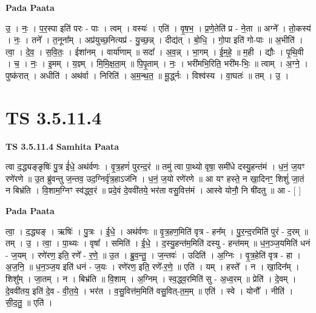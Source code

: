 \documentclass[17pt]{extarticle}
\begin{document}
\textbf{Pada Paata} \newline

उ॒ । नः॒ । प॒र॒स्पा इति॑ परः - पाः । त्वम् । वस्यः॑ । एति॑ । वृ॒ष॒भ॒ । प्र॒णे॒तेति॑ प्र - ने॒ता ॥ अग्ने᳚ । तो॒कस्य॑ । नः॒ । तने᳚ । त॒नूना᳚म् । अप्र॑युच्छ॒नित्यप्र॑ - यु॒च्छ॒न्न् । दीद्य॑त् । बो॒धि॒ । गो॒पा इति॑ गो-पाः ॥ अ॒भीति॑ । त्वा॒ । दे॒व॒ । स॒वि॒तः॒ । ईशा॑नम् । वार्या॑णाम् ॥ सदा᳚ । अ॒व॒न्न् । भा॒गम् । ई॒म॒हे॒ ॥ म॒ही । द्यौः । पृ॒थि॒वी । च॒ । नः॒ । इ॒मम् । य॒ज्ञ्म् । मि॒मि॒क्ष॒ता॒म् ॥ पि॒पृ॒ताम् । नः॒ । भरी॑मभि॒रिति॒ भरी॑म-भिः॒ ॥ त्वाम् । अ॒ग्ने॒ । पुष्क॑रात् । अधीति॑ । अथ॑र्वा । निरिति॑ । अ॒म॒न्थ॒त॒ ॥ मू॒र्द्ध्नः । विश्व॑स्य । वा॒घतः॑ ॥ तम् । उ॒ ।  \newline





\section{ TS 3.5.11.4 }

\textbf{TS 3.5.11.4 } \newline
\textbf{Samhita Paata} \newline

त्वा द॒द्ध्यङ्ङृषिः॑ पु॒त्र ई॑धे॒ अथ॑र्वणः । वृ॒त्र॒हणं॑ पुरन्द॒रं ॥ तमु॑ त्वा पा॒थ्यो वृषा॒ समी॑धे दस्यु॒हन्त॑मं । ध॒नं॒ ज॒यꣳ रणे॑रणे ॥ उ॒त ब्रु॑वन्तु ज॒न्तव॒ उद॒ग्निर्वृ॑त्र॒हाऽज॑नि । ध॒नं॒ ज॒यो रणे॑रणे ॥ आ यꣳ हस्ते॒ न खा॒दिनꣳ॒॒ शिशुं॑ जा॒तं न बिभ्र॑ति । वि॒शाम॒ग्निꣳ स्व॑द्ध्व॒रं ॥ प्रदे॒वं दे॒ववी॑तये॒ भर॑ता वसु॒वित्त॑मं । आस्वे योनौ॒ नि षी॑दतु ॥ आ - [  ] \newline

\textbf{Pada Paata} \newline

त्वा॒ । द॒द्ध्यङ् । ऋषिः॑ । पु॒त्रः । ई॒धे॒ । अथ॑र्वणः ॥ वृ॒त्र॒हण॒मिति॑ वृत्र - हन᳚म् । पु॒र॒न्द॒रमिति॑ पुरं - द॒रम् ॥ तम् । उ॒ । त्वा॒ । पा॒थ्यः । वृषा᳚ । समिति॑ । ई॒धे॒ । द॒स्यु॒हन्त॑म॒मिति॑ दस्यु - हन्त॑मम् ॥ ध॒न॒ञ्ज॒यमिति॑ धनं - ज॒यम् । रणे॑रण॒ इति॒ रणे᳚ - र॒णे॒ ॥ उ॒त । ब्रु॒व॒न्तु॒ । ज॒न्तवः॑ । उदिति॑ । अ॒ग्निः । वृ॒त्र॒हेति॑ वृत्र - हा । अ॒ज॒नि॒ ॥ ध॒न॒ञ्ज॒य इति॑ धनं - ज॒यः । रणे॑रण॒ इति॒ रणे᳚-र॒णे॒ ॥ एति॑ । यम् । हस्ते᳚ । न । खा॒दिन᳚म् । शिशु᳚म् । जा॒तम् । न । बिभ्र॑ति ॥ वि॒शाम् । अ॒ग्निम् । स्व॒द्ध्व॒रमिति॑ सु - अ॒ध्व॒रम् ॥ प्रेति॑ । दे॒वम् । दे॒ववी॑तय॒ इति॑ दे॒व - वी॒त॒ये॒ । भर॑त । व॒सु॒वित्त॑म॒मिति॑ वसु॒वित्-त॒म॒म् ॥ एति॑ । स्वे । योनौ᳚ । नीति॑ । सी॒द॒तु॒ ॥ एति॑ ।  \newline
\end{document}
